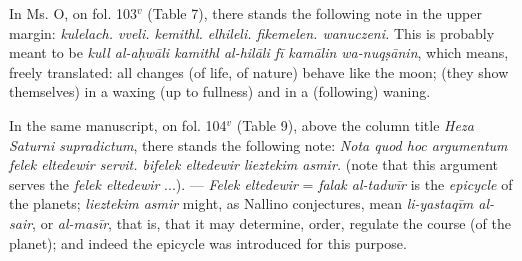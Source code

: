 \documentclass[11pt]{article}
\begin{document}
\par In Ms. O, on fol. 103$^{v}$ (Table 7), there stands the following note in the upper margin: \emph{kulelach. vveli. kemithl. elhileli. fikemelen. wanuczeni.} This is probably meant to be \emph{kull al-aḥwāli kamithl al-hilāli fī kamālin wa-nuqṣānin}, which means, freely translated: all changes (of life, of nature) behave like the moon; (they show themselves) in a waxing (up to fullness) and in a (following) waning.\par
\par In the same manuscript, on fol. 104$^{v}$ (Table 9), above the column title \emph{Heza Saturni supradictum}, there stands the following note: \emph{Nota quod hoc argumentum felek eltedewir servit. bifelek eltedewir lieztekim asmir.} (note that this argument serves the \emph{felek eltedewir} ...). — \emph{Felek eltedewir} = \emph{falak al-tadwīr} is the \emph{epicycle} of the planets; \emph{lieztekim asmir} might, as Nallino conjectures, mean \emph{li-yastaqīm al-sair}, or \emph{al-masīr}, that is, that it may determine, order, regulate the course (of the planet); and indeed the epicycle was introduced for this purpose.\par
\end{document}
